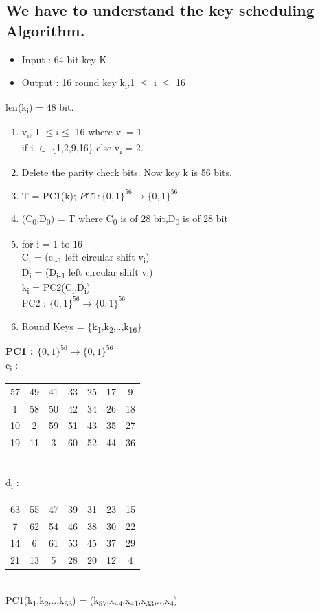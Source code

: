 \documentclass[11pt]{article}
\begin{document}
	\subsection{We have to understand the key scheduling Algorithm.} 
	\begin{itemize}
		\item Input : 64 bit key K.
		\item Output : 16 round key k\textsubscript{i},1 $\leq$ i $\leq$ 16
	\end{itemize}
	len(k\textsubscript{i}) = 48 bit.
	\begin{enumerate}
		\item v\textsubscript{i}, 1 $\leq i \leq$ 16 where v\textsubscript{i} = 1\\
		if i $\in$ \{1,2,9,16\} else v\textsubscript{i} = 2.
		\item Delete the parity check bits. Now key k is 56 bits.
		\item T = PC1(k); $PC1 : \{0,1\}^{56} \rightarrow \{0,1\}^{56}$ 
		\item (C\textsubscript{0},D\textsubscript{0}) = T where C\textsubscript{0} is of 28 bit,D\textsubscript{0} is of 28 bit
		\item for i = 1 to 16\\
		C\textsubscript{i} = (c\textsubscript{i-1} left circular shift v\textsubscript{i})\\
		D\textsubscript{i} = (D\textsubscript{i-1} left circular shift v\textsubscript{i})\\
		k\textsubscript{i} = PC2(C\textsubscript{i},D\textsubscript{i}) \\
		PC2 : $\{0,1\}^{56} \rightarrow \{0,1\}^{56}$
		\item Round Keys = \{k\textsubscript{1},k\textsubscript{2},..,k\textsubscript{16}\}
	\end{enumerate}
	
	\textbf{PC1 : $\{0,1\}^{56} \rightarrow \{0,1\}^{56}$}\\
	c\textsubscript{i} :
	\begin{tabular}{ c c c c c c c }
		57 & 49 & 41 & 33 & 25 & 17 & 9 \\ 
		1 & 58 & 50 & 42 & 34 & 26 & 18\\  
		10 & 2 & 59 & 51 & 43 & 35 & 27\\
		19 & 11 & 3 & 60 & 52 & 44 & 36
	\end{tabular}\\
	d\textsubscript{i} :
	\begin{tabular}{ c c c c c c c }
		63 & 55 & 47 & 39 & 31 & 23 & 15\\ 
		7 & 62 & 54 & 46 & 38 & 30 & 22\\  
		14 & 6 & 61 & 53 & 45 & 37 & 29\\
		21 & 13 & 5 & 28 & 20 & 12 & 4
	\end{tabular}\\
	PC1(k\textsubscript{1},k\textsubscript{2},..,k\textsubscript{63}) = (k\textsubscript{57},x\textsubscript{44},x\textsubscript{41},x\textsubscript{33},..,x\textsubscript{4})\\
	
\end{document}
